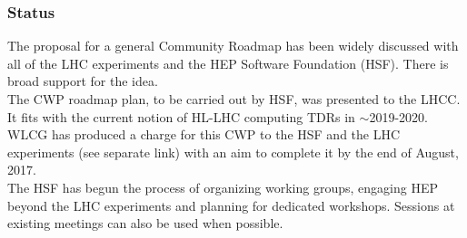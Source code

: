 \begin{frame}
\frametitle{Status}

\noindent 
The proposal for a general Community Roadmap has been widely discussed with all of the LHC experiments and the HEP Software Foundation (HSF). There is broad support for the idea. \\
\vskip 0.1in
The CWP roadmap plan, to be carried out by HSF, was presented to the LHCC. It fits with the current notion of HL-LHC computing TDRs in $\sim$2019-2020.\\
\vskip 0.1in
WLCG has produced a charge for this CWP to the HSF and the LHC experiments (see separate link) with an aim to complete it by the end of August, 2017. \\
\vskip 0.1in
The HSF has begun the process of organizing working groups, engaging HEP beyond the LHC experiments and planning for dedicated workshops. Sessions at existing meetings can also be used when possible. \\

\end{frame}


